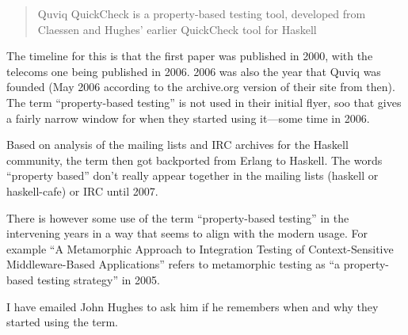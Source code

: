 \begin{quote}
Quviq QuickCheck is a property-based testing tool, developed from
Claessen and Hughes' earlier QuickCheck tool for Haskell
\end{quote}

The timeline for this is that the first paper was published in 2000,
with the telecoms one being published in 2006.
2006 was also the year that Quviq was founded (May 2006 according to the archive.org version of their site from then).
The term ``property-based testing'' is not used in their initial flyer,
soo that gives a fairly narrow window for when they started using it---some
time in 2006.

Based on analysis of the mailing lists and IRC archives for the Haskell community,
the term then got backported from Erlang to Haskell.
The words ``property based'' don't really appear together in the mailing lists (haskell or haskell-cafe) or IRC until 2007.

There is however some use of the term ``property-based testing'' in the intervening years in a way that seems to align with the modern usage.
For example ``A Metamorphic Approach to Integration Testing of Context-Sensitive Middleware-Based Applications''\cite{DBLP:conf/qsic/ChanCL05} refers to metamorphic testing as ``a property-based testing strategy'' in 2005.

I have emailed John Hughes to ask him if he remembers when and why they started using the term.
